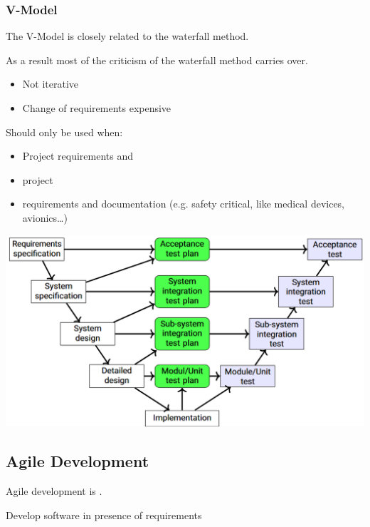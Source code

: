 \documentclass[
    ../../Software_Engineering_Summary.tex,
]
{subfiles}
\begin{document}
\newpage
\subsubsection{V-Model}
The V-Model is closely related to the waterfall method.

\begin{minipage}
    [c]{0.4\textwidth}
    As a result most of the criticism of the waterfall method carries over.
    \begin{itemize}
        \item Not iterative
        \item Change of requirements expensive
    \end{itemize}

    Should only be used when:
    \begin{itemize}
        \item Project requirements  and 
        \item {} project
        \item {} requirements and documentation (e.g. safety critical, like medical devices, avionics\dots)
    \end{itemize}
\end{minipage}
\begin{minipage}
    [c]{0.6\textwidth}
    \centering
    \includegraphics[width = \textwidth]{Pics/13/VModel.png}
\end{minipage}

\subsection{Agile Development}
Agile development is .

\begin{defbox}
    [Goal]
    Develop software  in presence of  requirements 
\end{defbox}
\end{document}
